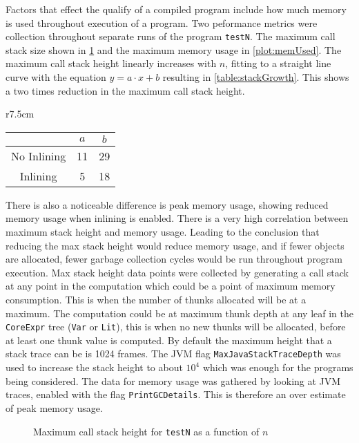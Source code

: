 \documentclass[float=false, crop=false]{standalone}
\newlength\gwidth
\newlength\gheight
\newcommand{\importMGraph}[3]{\setlength{\gwidth}{#2}\setlength{\gheight}{#3}{#1}}
\begin{document}
Factors that effect the qualify of a compiled program include how much memory
is used throughout execution of a program. Two peformance metrics were collection throughout
separate runs of the program \texttt{testN}. The maximum call stack size
shown in \cref{plot:stackSize} and the maximum 
memory usage in \cref{plot:memUsed}. 
The maximum call stack height linearly increases with $n$, fitting to a straight line curve
with the equation $y = a\cdot x + b$ resulting in \cref{table:stackGrowth}.
This shows a two times reduction in the maximum call stack height. 
\begin{wraptable}{r}{7.5cm}
  \centering
  \begin{tabular}{ c | c c}
  & $a$ & $b$\\
  \hline
  No Inlining & 11 & 29 \\
  Inlining & 5 & 18 
  \end{tabular}
  \caption{Fitting of the data from \cref{plot:stackSize}  
    to the line $y = a\cdot x + b$.}
  \label{table:stackGrowth}
\end{wraptable}
There is also a noticeable difference is peak memory usage, 
showing reduced memory usage when inlining is enabled.
There is a very high correlation between maximum stack height and memory usage.
Leading to the conclusion that reducing the max stack height would 
reduce memory usage, and if fewer objects are allocated, fewer garbage collection cycles would be
run throughout program execution.
Max stack height data points were collected by generating a call stack at any 
point in the computation which could be a point of maximum memory consumption. This is when 
the number of thunks allocated will be at a maximum.
The computation could be at maximum thunk depth at any leaf in the \texttt{CoreExpr} tree
(\texttt{Var} or \texttt{Lit}), this is when no new thunks will be allocated, before at least one thunk
value is computed. By default the maximum height that a stack trace can be is 1024 frames. 
The JVM flag \texttt{MaxJavaStackTraceDepth} was used to increase
the stack height to about $10^{4}$ which was enough for the programs being considered.
The data for memory usage was gathered by looking at JVM traces, 
enabled with the flag \texttt{PrintGCDetails}. 
This is therefore an over estimate of peak memory usage. 

\begin{figure}
  \centering
  \importMGraph{plotCallStackGrowth}{0.96\textwidth}{0.3\textwidth}
  \caption{Maximum call stack height for \texttt{testN} as a function of $n$}
  \label{plot:stackSize}
\end{figure}
\end{document}
